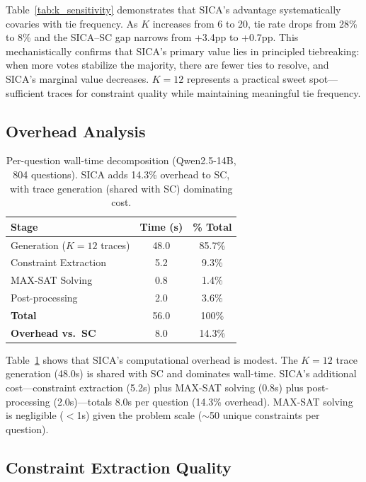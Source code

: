 \documentclass[11pt,a4paper]{article}
\begin{document}
Table~\ref{tab:k_sensitivity} demonstrates that SICA's advantage systematically covaries with tie frequency. As $K$ increases from 6 to 20, tie rate drops from 28\% to 8\% and the SICA--SC gap narrows from +3.4pp to +0.7pp. This mechanistically confirms that SICA's primary value lies in principled tiebreaking: when more votes stabilize the majority, there are fewer ties to resolve, and SICA's marginal value decreases. $K=12$ represents a practical sweet spot---sufficient traces for constraint quality while maintaining meaningful tie frequency.

\subsection{Overhead Analysis}

\begin{table}[t]
\centering
\small
\begin{tabular}{@{}lcc@{}}
\toprule
\textbf{Stage} & \textbf{Time (s)} & \textbf{\% Total} \\
\midrule
Generation ($K=12$ traces) & 48.0 & 85.7\% \\
Constraint Extraction & 5.2 & 9.3\% \\
MAX-SAT Solving & 0.8 & 1.4\% \\
Post-processing & 2.0 & 3.6\% \\
\midrule
\textbf{Total} & 56.0 & 100\% \\
\textbf{Overhead vs.\ SC} & 8.0 & 14.3\% \\
\bottomrule
\end{tabular}
\caption{Per-question wall-time decomposition (Qwen2.5-14B, 804 questions). SICA adds 14.3\% overhead to SC, with trace generation (shared with SC) dominating cost.}
\label{tab:overhead}
\end{table}

Table~\ref{tab:overhead} shows that SICA's computational overhead is modest. The $K=12$ trace generation (48.0s) is shared with SC and dominates wall-time. SICA's additional cost---constraint extraction (5.2s) plus MAX-SAT solving (0.8s) plus post-processing (2.0s)---totals 8.0s per question (14.3\% overhead). MAX-SAT solving is negligible ($<$1s) given the problem scale ($\sim$50 unique constraints per question).

\subsection{Constraint Extraction Quality}
\label{sec:extraction}
\end{document}
